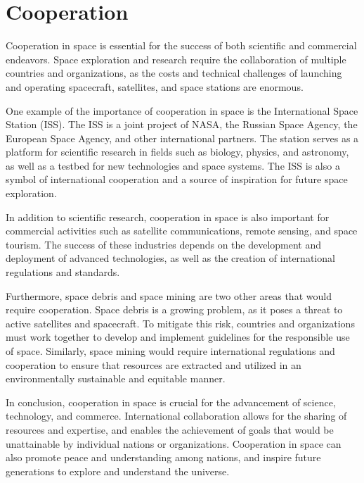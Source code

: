\section{Cooperation}

Cooperation in space is essential for the success of both scientific and commercial endeavors. Space exploration and research require the collaboration of multiple countries and organizations, as the costs and technical challenges of launching and operating spacecraft, satellites, and space stations are enormous.

One example of the importance of cooperation in space is the International Space Station (ISS). The ISS is a joint project of NASA, the Russian Space Agency, the European Space Agency, and other international partners. The station serves as a platform for scientific research in fields such as biology, physics, and astronomy, as well as a testbed for new technologies and space systems. The ISS is also a symbol of international cooperation and a source of inspiration for future space exploration.

In addition to scientific research, cooperation in space is also important for commercial activities such as satellite communications, remote sensing, and space tourism. The success of these industries depends on the development and deployment of advanced technologies, as well as the creation of international regulations and standards.

Furthermore, space debris and space mining are two other areas that would require cooperation. Space debris is a growing problem, as it poses a threat to active satellites and spacecraft. To mitigate this risk, countries and organizations must work together to develop and implement guidelines for the responsible use of space. Similarly, space mining would require international regulations and cooperation to ensure that resources are extracted and utilized in an environmentally sustainable and equitable manner.

In conclusion, cooperation in space is crucial for the advancement of science, technology, and commerce. International collaboration allows for the sharing of resources and expertise, and enables the achievement of goals that would be unattainable by individual nations or organizations. Cooperation in space can also promote peace and understanding among nations, and inspire future generations to explore and understand the universe.